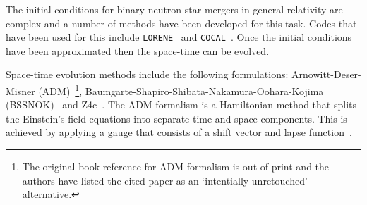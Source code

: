 \documentclass[../Thesis.tex]{subfiles}
\begin{document}
    The initial conditions for binary neutron star mergers in general relativity are complex and a number of methods have been developed for this task.
    Codes that have been used for this include \texttt{LORENE}~\cite{Gourgoulhon2001} and \texttt{COCAL}~\cite{Tsokaros2015}.
    Once the initial conditions have been approximated then the space-time can be evolved.

    Space-time evolution methods include the following formulations: Arnowitt-Deser-Misner (ADM)~\cite{Arnowitt2008}\footnote{The original book reference for ADM formalism is out of print and the authors have listed the cited paper as an `intentially unretouched' alternative.},  Baumgarte-Shapiro-Shibata-Nakamura-Oohara-Kojima (BSSNOK)~\cite{Nakamura1987,Shibata1995,Baumgarte1999,Alcubierre2000} and Z4c~\cite{Bona2003,Bona2004,Gundlach2005,Bernuzzi2010,Hilditch2013}. 
    The ADM formalism is a Hamiltonian method that splits the Einstein's field equations into separate time and space components.
    This is achieved by applying a gauge that consists of a shift vector and lapse function~\cite{Arnowitt2008}.
      \par
    
\end{document}
